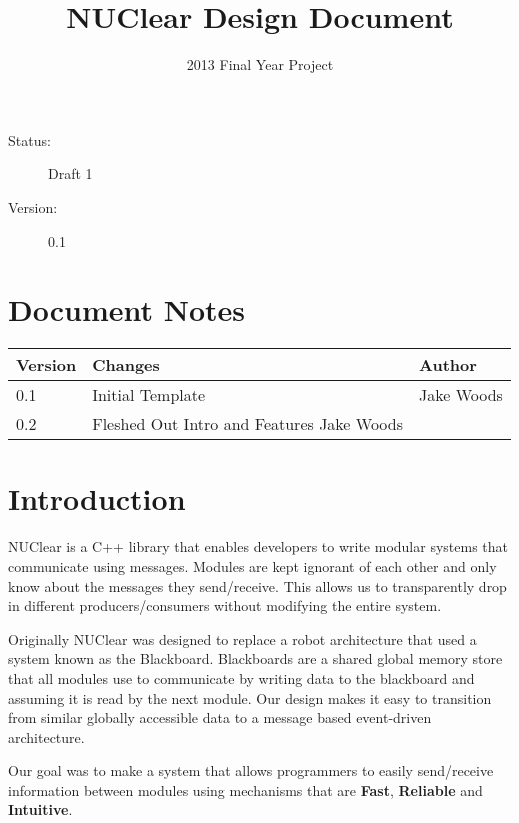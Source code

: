 \documentclass[english,12pt]{scrartcl}
\title{NUClear Design Document}
\author{2013 Final Year Project}
\begin{document}
	\maketitle
	\vfill
	{\large
		\begin{description}
			\item [Status:] Draft 1
			\item [Version:] 0.1
		\end{description}}

	\clearpage
	\tableofcontents

	\section{Document Notes}
		\begin{tabular}{ p{} | p{} | p{} }
			\textbf{Version} & \textbf{Changes} & \textbf{Author} \\
			\hline

			0.1 &
			Initial Template &
			Jake Woods \\
			\hline

			0.2 &
			Fleshed Out Intro and Features
			Jake Woods \\
			\hline
		\end{tabular}
		
	\clearpage
		
	\section{Introduction}
		NUClear is a C++ library that enables developers to write modular systems that communicate using messages. 
		Modules are kept ignorant of each other and only know about the messages they send/receive. 
		This allows us to transparently drop in different producers/consumers without modifying the entire system.
		
		Originally NUClear was designed to replace a robot architecture that used a system known as the Blackboard.
		Blackboards are a shared global memory store that all modules use to communicate by writing data to the blackboard and assuming it is read by the next module.
		Our design makes it easy to transition from similar globally accessible data to a message based event-driven architecture.
		
		Our goal was to make a system that allows programmers to easily send/receive information between modules using mechanisms that are \textbf{Fast}, \textbf{Reliable} and \textbf{Intuitive}.
\end{document}
